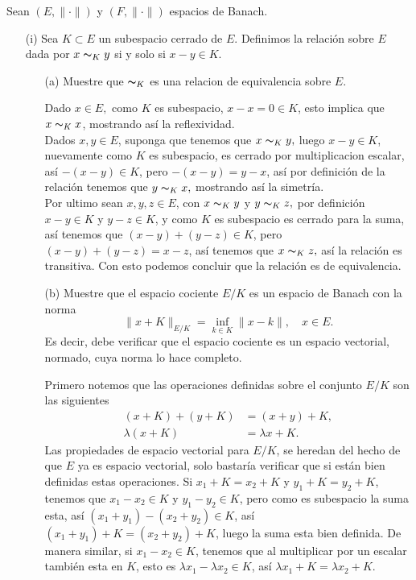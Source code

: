 Sean $(E,\|\cdot\|)$ y $(F,\|\cdot\|)$ espacios de Banach.
\begin{itemize}
    \item[(i)] Sea $K\subset E$ un subespacio cerrado de $E.$ Definimos la relación sobre $E$ dada por $x\thicksim_Ky$ si y solo si $x-y\in K.$
    \begin{itemize}
        \item[(a)] Muestre que $\thicksim_K$ es una relacion de equivalencia sobre $E.$\\
        \begin{sproof}
            Dado $x\in E,$ como $K$ es subespacio, $x-x=0\in K$, esto implica que $x\thicksim_K x$, mostrando así la reflexividad.\\

            Dados $x,y\in E$, suponga que tenemos que $x\thicksim_K y,$ luego $x-y\in K$, nuevamente como $K$ es subespacio, es cerrado por multiplicacion escalar, así $-(x-y)\in K$, pero $-(x-y)=y-x$, así por definición de la relación tenemos que $y\thicksim_K x,$ mostrando así la simetría.\\

            Por ultimo sean $x,y,z\in E$, con $x\thicksim_K y$ y $y\thicksim_K z,$ por definición $x-y\in K$ y $y-z\in K$, y como $K$ es subespacio es cerrado para la suma, así tenemos que $(x-y)+(y-z)\in K$, pero $(x-y)+(y-z)=x-z$, así tenemos que $x\thicksim_K z,$ así la relación es transitiva. Con esto podemos concluir que la relación es de equivalencia. 

        \end{sproof}
        \item[(b)] Muestre que el espacio cociente $E/K$ es un espacio de Banach con la norma
        $$\|x+K\|_{E/K}=\inf_{k\in K}\|x-k\|,\quad x\in E.$$ 
        Es decir, debe verificar que el espacio cociente es un espacio vectorial, normado, cuya norma lo hace completo.
        \begin{sproof}
            Primero notemos que las operaciones definidas sobre el conjunto $E/K$ son las siguientes
            \begin{align*}
                (x+K)+(y+K)&=(x+y)+K,\\
                \lambda(x+K)&=\lambda x+K.
            \end{align*}
            Las propiedades de espacio vectorial para $E/K$, se heredan del hecho de que $E$ ya es espacio vectorial, solo bastaría verificar que si están bien definidas estas operaciones. Si $x_1+K=x_2+K$ y $y_1+K=y_2+K$, tenemos que $x_1-x_2\in K$ y $y_1-y_2\in K$, pero como es subespacio la suma esta, así $(x_1+y_1)-(x_2+y_2)\in K$, así $(x_1+y_1)+K=(x_2+y_2)+ K$, luego la suma esta bien definida. De manera similar, si $x_1-x_2\in K$, tenemos que al multiplicar por un escalar también esta en $K$, esto es $\lambda x_1-\lambda x_2\in K$, así $\lambda x_1+K=\lambda x_2+K.$\\


\end{sproof}
\end{itemize}
\end{itemize}
